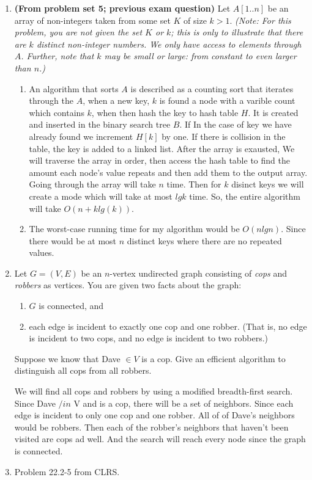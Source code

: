 \documentclass[letterpaper,11pt]{article}
\begin{document}
\begin{enumerate}

\item \textbf{(From problem set 5; previous exam question)} Let $A[1..n]$ be an array of non-integers taken from some set $K$ of size $k>1$. \emph{(Note: For this problem, you are not given the set $K$ or $k$; this is only to illustrate that there are $k$ distinct non-integer numbers. We only have access to elements through $A$. Further, note that $k$ may be small or large: from constant to even larger than $n$.)}
\begin{enumerate}
\item 
An algorithm that sorts $A$ is described as a counting sort that iterates through the $A$, when a new key, $k$ is found a node with a varible count which contains $k$, when then hash the key to hash table $H$. It is created and inserted in the binary search tree $B$. If In the case of key we have already found we increment $H[k]$ by one. If there is collision in the table, the key is added to a linked list. After the array is exausted, We will traverse the array in order, then access the hash table to find the amount each node's value repeats and then add them to the output array. Going through the array will take $n$ time. Then for $k$ disinct keys we will create a mode which will take at most $lg k$ time. So, the entire algorithm will take $O(n + klg(k))$.
 
\item 
The worst-case running time for my algorithm would be $O(n lg n)$. Since there would be at most $n$ distinct keys where there are no repeated values.
\end{enumerate}

\item Let $G=(V,E)$ be an $n$-vertex undirected graph consisting of \emph{cops} and \emph{robbers} as vertices. You are given two facts about the graph:
\begin{enumerate}
\item $G$ is connected, and
\item each edge is incident to exactly one cop and one robber. (That is, no edge is incident to two cops, and no edge is incident to two robbers.)
\end{enumerate}
Suppose we know that Dave $\in V$ is a cop. Give an efficient algorithm to distinguish all cops from all robbers.

We will find all cops and robbers by using a modified breadth-first search. Since Dave $/in$ V and is a cop, there will be a set of neighbors. Since each edge is incident to only one cop and one robber. All of of Dave's neighbors would be robbers. Then each of the robber's neighbors that haven't been visited are cops ad well. And the search will reach every node since the graph is connected. 
\item Problem 22.2-5 from CLRS.


\end{enumerate}
\end{document}

